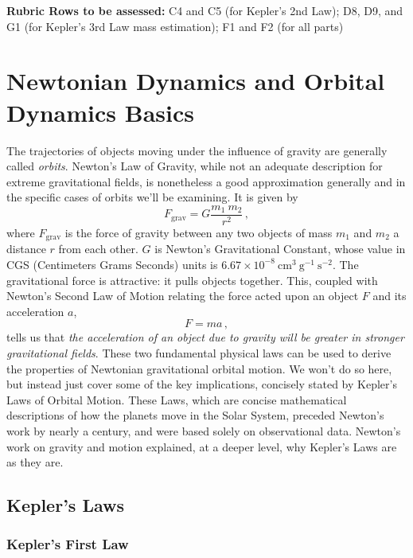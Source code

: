 \textbf{Rubric Rows to be assessed:} C4 and C5 (for Kepler's 2nd Law); D8, D9, and G1 (for Kepler's 3rd Law mass estimation); F1 and F2 (for all parts)

\section{Newtonian Dynamics and Orbital Dynamics Basics}

The trajectories of objects moving under the influence of gravity are generally called \textit{orbits}. Newton's
Law of Gravity, while not an adequate description for extreme gravitational fields, is nonetheless a good
approximation generally and in the specific cases of orbits we'll be examining. It is given by
\begin{equation}\label{gc:eq:newton}
 F_\textrm{grav} = G \frac{m_1 \: m_2}{r^2} \, ,
\end{equation}
where $F_\textrm{grav}$ is the force of gravity between any two objects of mass $m_1$ and $m_2$ a distance $r$ from each other. $G$ is Newton's Gravitational Constant, whose value in CGS (Centimeters Grams Seconds) units
is $6.67 \times 10^{-8}\:\textrm{cm}^3 \: \textrm{g}^{-1} \: \textrm{s}^{-2}$. The gravitational force is attractive: it pulls objects together. This, coupled
with Newton's Second Law of Motion relating the force acted upon an object $F$ and its acceleration $a$,
\begin{equation}
 F = ma \,,
\end{equation}
tells us that \textit{the acceleration of an object due to gravity will be greater in stronger gravitational fields}.
These two fundamental physical laws can be used to derive the properties of Newtonian gravitational
orbital motion. We won't do so here, but instead just cover some of the key implications, concisely
stated by Kepler's Laws of Orbital Motion. These Laws, which are concise mathematical descriptions
of how the planets move in the Solar System, preceded Newton's work by nearly a century, and were
based solely on observational data. Newton's work on gravity and motion explained, at a deeper level,
why Kepler's Laws are as they are.

\subsection{Kepler's Laws}

\subsubsection{Kepler's First Law}

